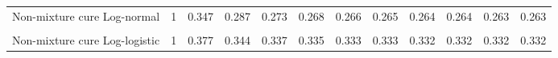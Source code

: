 \documentclass[
]{article}
\begin{document}
\begin{table}[H]
{\begin{tabular}[t]{lrrrrrrrrrrr}
Non-mixture cure Log-normal & 1 & 0.347 & 0.287 & 0.273 & 0.268 & 0.266 & 0.265 & 0.264 & 0.264 & 0.263 & 0.263\\
\cellcolor{gray!10}{Mixture cure Log-logistic} & \cellcolor{gray!10}{1} & \cellcolor{gray!10}{0.372} & \cellcolor{gray!10}{0.337} & \cellcolor{gray!10}{0.330} & \cellcolor{gray!10}{0.327} & \cellcolor{gray!10}{0.326} & \cellcolor{gray!10}{0.325} & \cellcolor{gray!10}{0.325} & \cellcolor{gray!10}{0.325} & \cellcolor{gray!10}{0.324} & \cellcolor{gray!10}{0.324}\\
Non-mixture cure Log-logistic & 1 & 0.377 & 0.344 & 0.337 & 0.335 & 0.333 & 0.333 & 0.332 & 0.332 & 0.332 & 0.332\\
\bottomrule
\end{tabular}}
\end{table}
\end{document}
